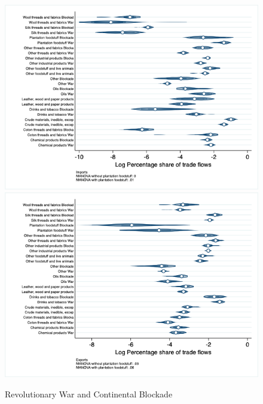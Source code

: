 \documentclass[12pt,a4paper,notitlepage,english]{article}
\begin{document}
\begin{appendix}
\begin{figure}[h!]
\centering
\caption{Revolutionary War and Continental Blockade}
\label{rev_block_nat_distr_sitc}
\includegraphics[scale=.4]{rev_block_nat_distr_Isitc}
\includegraphics[scale=.4]{rev_block_nat_distr_Xsitc}
\end{figure}


\end{appendix}
\end{document}
